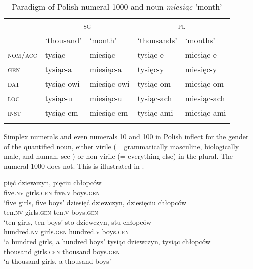 \documentclass[output=paper]{langscibook}
\begin{document}
\begin{table}
\caption{Paradigm of Polish numeral 1000 and noun \textit{miesiąc} 'month'}
\label{klo:tab:Polish1000}
 \begin{tabular}{lllll} 
  \lsptoprule
            & \multicolumn{2}{c}{\textsc{sg}} & \multicolumn{2}{c}{\textsc{pl}} \\\cmidrule(lr){2-3}\cmidrule(lr){4-5}
            & `thousand' & `month' & `thousands' & `months'\\
  \midrule
  \textsc{nom}/\textsc{acc}  &   tysiąc & miesiąc & tysiąc-e & miesiąc-e  \\
  \textsc{gen} & tysiąc-a & miesiąc-a & tysięc-y & miesięc-y \\
  \textsc{dat} & tysiąc-owi & miesiąc-owi & tysiąc-om & miesiąc-om \\
  \textsc{loc} & tysiąc-u & miesiąc-u & tysiąc-ach & miesiąc-ach \\
  \textsc{inst} & tysiąc-em & miesiąc-em & tysiąc-ami & miesiąc-ami \\
  \lspbottomrule
 \end{tabular}
\end{table}

Simplex numerals and even numerals 10 and 100 in Polish inflect for the gender of the quantified noun, either virile (= grammatically masculine, biologically male, and human, see \citealt{rappaport2011gender}) or non-virile (= everything else) in the plural. The numeral 1000 does not. This is illustrated in .

\ea \label{klo:ex:5,10,100,1000V.NV} \ea
\gll pięć dziewczyn, pięciu chłopców\\
five.\textsc{nv} girls.\textsc{gen} five.\textsc{v} boys.\textsc{gen}\\
\glt `five girls, five boys'
\ex \gll dziesięć dziewczyn, dziesięciu chłopców\\
ten.\textsc{nv} girls.\textsc{gen} ten.\textsc{v} boys.\textsc{gen}\\
\glt `ten girls, ten boys'
\ex \gll sto dziewczyn, stu chłopców\\
hundred.\textsc{nv} girls.\textsc{gen} hundred.\textsc{v} boys.\textsc{gen}\\
\glt `a hundred girls, a hundred boys'
\ex \gll tysiąc dziewczyn, tysiąc chłopców\\
thousand girls.\textsc{gen} thousand boys.\textsc{gen}\\
\glt `a thousand girls, a thousand boys'
\z \z %
\end{document}
